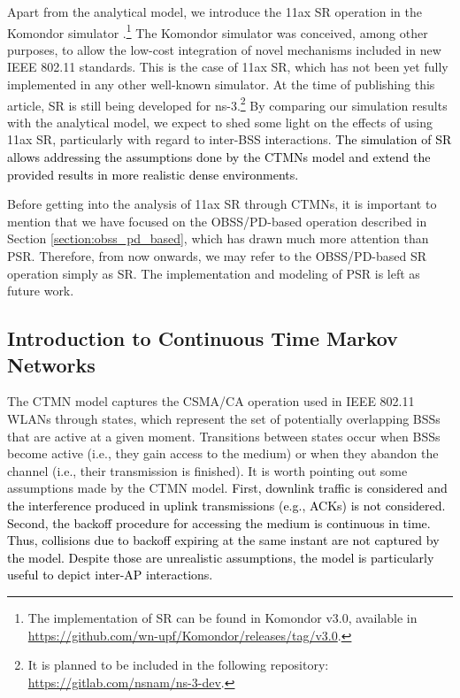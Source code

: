 \documentclass{article}
\begin{document}
Apart from the analytical model, we introduce the 11ax SR operation in the Komondor simulator \cite{barrachina2019komondor}.\footnote{The implementation of SR can be found in Komondor v3.0, available in \url{https://github.com/wn-upf/Komondor/releases/tag/v3.0}.} The Komondor simulator was conceived, among other purposes, to allow the low-cost integration of novel mechanisms included in new IEEE 802.11 standards. This is the case of 11ax SR, which has not been yet fully implemented in any other well-known simulator. At the time of publishing this article, SR is still being developed for ns-3.\footnote{It is planned to be included in the following repository: \url{https://gitlab.com/nsnam/ns-3-dev}.} By comparing our simulation results with the analytical model, we expect to shed some light on the effects of using 11ax SR, particularly with regard to inter-BSS interactions. \textcolor{black}{The simulation of SR allows addressing the assumptions done by the CTMNs model and extend the provided results in more realistic dense environments.}

Before getting into the analysis of 11ax SR through CTMNs, it is important to mention that we have focused on the OBSS/PD-based operation described in Section \ref{section:obss_pd_based}, which has drawn much more attention than PSR. Therefore, from now onwards, we may refer to the OBSS/PD-based SR operation simply as SR. The implementation and modeling of PSR is left as future work.

\subsection{Introduction to Continuous Time Markov Networks}
The CTMN model captures the CSMA/CA operation used in IEEE 802.11 WLANs through states, which represent the set of potentially overlapping BSSs that are active at a given moment. Transitions between states occur when BSSs become active (i.e., they gain access to the medium) or when they abandon the channel (i.e., their transmission is finished). It is worth pointing out some assumptions made by the CTMN model. \textcolor{black}{First, downlink traffic is considered and the interference produced in uplink transmissions (e.g., ACKs) is not considered. Second, the backoff procedure for accessing the medium is continuous in time. Thus, collisions due to backoff expiring at the same instant are not captured by the model. Despite those are unrealistic assumptions, the model is particularly useful to depict inter-AP interactions.}
\end{document}
